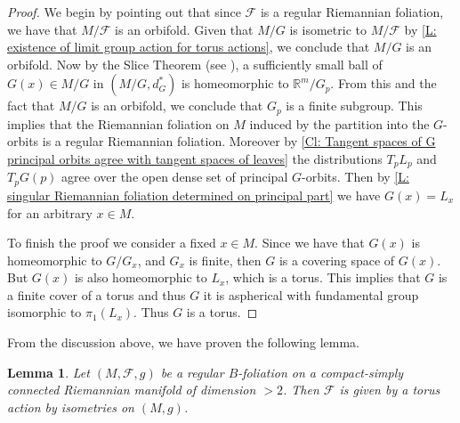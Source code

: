 \documentclass[12pt,a4paper,reqno]{amsart}
\newtheorem{lemma}[theorem]{Lemma}
\theoremstyle{definition}
\numberwithin{equation}{section}
\newcommand{\fol}{\mathcal{F}}
\newcommand{\R}{\mathbb{R}} %
\begin{document}
\begin{proof}
We begin by pointing out that since $\fol$ is a regular Riemannian foliation, we have that $M/\fol$ is an orbifold. Given that $M/G$ is isometric to $M/\fol$ by \th\ref{L: existence of limit group action for torus actions}, we conclude that $M/G$ is an orbifold. Now by the Slice Theorem (see \cite[Theorem 3.57]{AlexandrinoBettiol}), a sufficiently small ball of $G(x)\in M/G$ in  $(M/G,d^\ast_G)$ is homeomorphic to $\R^m/G_p$. From this and the fact that $M/G$ is an orbifold, we conclude that $G_p$ is a finite subgroup. This implies that the Riemannian foliation on $M$ induced by the partition into the $G$-orbits is a regular Riemannian foliation. Moreover by \th\ref{Cl: Tangent spaces of G principal orbits agree with tangent spaces of leaves} the distributions $T_pL_p$ and $T_pG(p)$ agree over the open dense set of principal $G$-orbits. Then by \th\ref{L: singular Riemannian foliation determined on principal part} we have  $G(x) =L_x$ for an arbitrary $x\in M$.

To finish the proof we consider a fixed $x\in M$. Since we have that $G(x)$ is homeomorphic to $G/G_x$, and $G_x$ is finite, then $G$ is a covering space of $G(x)$. But $G(x)$ is also homeomorphic to $L_x$, which is a torus. This implies that $G$ is a finite cover of a torus and thus $G$ it is aspherical with fundamental group isomorphic to $\pi_1(L_x)$. Thus $G$ is a torus.
\end{proof}

From the discussion above, we have proven the following lemma.

\begin{lemma}\th\label{L: case of dimension > 2}
Let $(M,\fol,g)$ be a regular $B$-foliation on a compact-simply connected Riemannian manifold of dimension $>2$. Then $\fol$ is given by a torus action by isometries on $(M,g)$.
\end{lemma}
\end{document}
